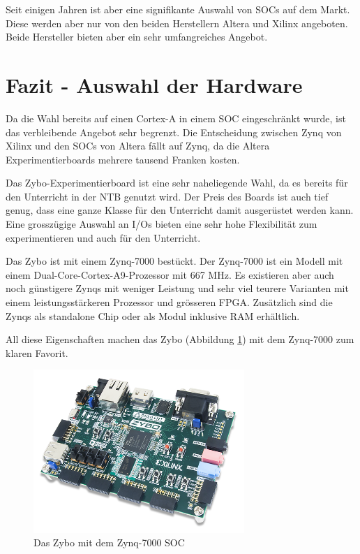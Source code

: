 Seit einigen Jahren ist aber eine signifikante Auswahl von SOCs auf dem Markt.
Diese werden aber nur von den beiden Herstellern Altera und Xilinx angeboten.
Beide Hersteller bieten aber ein sehr umfangreiches Angebot.


\section{Fazit - Auswahl der Hardware}
Da die Wahl bereits auf einen Cortex-A in einem SOC eingeschränkt wurde, ist das verbleibende Angebot sehr begrenzt.
Die Entscheidung zwischen Zynq von Xilinx und den SOCs von Altera fällt auf Zynq, da die Altera Experimentierboards mehrere tausend Franken kosten.

Das Zybo-Experimentierboard ist eine sehr naheliegende Wahl, da es bereits für den Unterricht in der NTB genutzt wird.
Der Preis des Boards ist auch tief genug, dass eine ganze Klasse für den Unterricht damit ausgerüstet werden kann.
Eine grosszügige Auswahl an I/Os bieten eine sehr hohe Flexibilität zum experimentieren und auch für den Unterricht.

Das Zybo ist mit einem Zynq-7000 bestückt.
Der Zynq-7000 ist ein Modell mit einem Dual-Core-Cortex-A9-Prozessor mit 667 MHz.
Es existieren aber auch noch günstigere Zynqs mit weniger Leistung und sehr viel teurere Varianten mit einem leistungsstärkeren Prozessor und grösseren FPGA.
Zusätzlich sind die Zynqs als standalone Chip oder als Modul inklusive RAM erhältlich.

All diese Eigenschaften machen das Zybo (Abbildung \ref{fig:zybo}) mit dem Zynq-7000 zum klaren Favorit.

\begin{figure}[htbp]
	\centering
		\includegraphics[width=8cm,height=\textheight,keepaspectratio]{images/zybo.png}
	\caption[]{Das Zybo mit dem Zynq-7000 SOC}
	\label{fig:zybo}
\end{figure}

